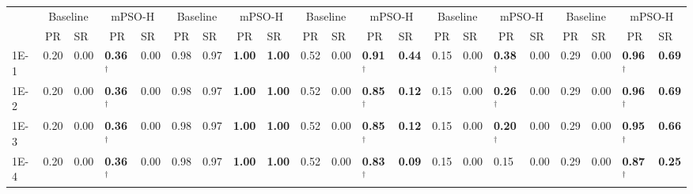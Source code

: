 \begin{table*}[h]
{\begin{tabular}{|p{4.8mm}|p{4.4mm}|p{4.4mm}|p{4.4mm}|p{4.4mm}|p{4.4mm}|p{4.4mm}|p{4.4mm}|p{4.4mm}|p{4.4mm}|p{4.4mm}|p{4.4mm}|p{4.4mm}|p{4.4mm}|p{4.4mm}|p{4.4mm}|p{4.4mm}|p{4.4mm}|p{4.4mm}|p{4.4mm}|p{4.4mm}|}
    \cline{2-21}
    & \multicolumn{2}{c|}{Baseline} & \multicolumn{2}{c|}{mPSO-H} & \multicolumn{2}{c|}{Baseline} & \multicolumn{2}{c|}{mPSO-H} & \multicolumn{2}{c|}{Baseline} & \multicolumn{2}{c|}{mPSO-H} & \multicolumn{2}{c|}{Baseline} & \multicolumn{2}{c|}{mPSO-H} & \multicolumn{2}{c|}{Baseline} & \multicolumn{2}{c|}{mPSO-H} \\

    \cline{2-21}
     & \multicolumn{1}{c|}{PR} & SR & \multicolumn{1}{c|}{PR} & SR & \multicolumn{1}{c|}{PR} & SR & \multicolumn{1}{c|}{PR} & SR & \multicolumn{1}{c|}{PR} & SR & \multicolumn{1}{c|}{PR} & SR & \multicolumn{1}{c|}{PR} & SR & \multicolumn{1}{c|}{PR} & SR & \multicolumn{1}{c|}{PR} & SR & \multicolumn{1}{c|}{PR} & SR \\
    \hline
    1E-1 & 0.20 & 0.00 & \textcolor{customblue}{\textbf{0.36$^\dagger$}} & 0.00 & 0.98 & 0.97 & \textcolor{customblue}{\textbf{1.00}} & \textcolor{customblue}{\textbf{1.00}} & 0.52 & 0.00 & \textcolor{customblue}{\textbf{0.91$^\dagger$}} & \textcolor{customblue}{\textbf{0.44}} & 0.15 & 0.00 & \textcolor{customblue}{\textbf{0.38$^\dagger$}} & 0.00 & 0.29 & 0.00 & \textcolor{customblue}{\textbf{0.96$^\dagger$}} & \textcolor{customblue}{\textbf{0.69}} \\
    1E-2 & 0.20 & 0.00 & \textcolor{customblue}{\textbf{0.36$^\dagger$}} & 0.00 & 0.98 & 0.97 & \textcolor{customblue}{\textbf{1.00}} & \textcolor{customblue}{\textbf{1.00}} & 0.52 & 0.00 & \textcolor{customblue}{\textbf{0.85$^\dagger$}} & \textcolor{customblue}{\textbf{0.12}} & 0.15 & 0.00 & \textcolor{customblue}{\textbf{0.26$^\dagger$}} & 0.00 & 0.29 & 0.00 & \textcolor{customblue}{\textbf{0.96$^\dagger$}} & \textcolor{customblue}{\textbf{0.69}} \\
    1E-3 & 0.20 & 0.00 & \textcolor{customblue}{\textbf{0.36$^\dagger$}} & 0.00 & 0.98 & 0.97 & \textcolor{customblue}{\textbf{1.00}} & \textcolor{customblue}{\textbf{1.00}} & 0.52 & 0.00 & \textcolor{customblue}{\textbf{0.85$^\dagger$}} & \textcolor{customblue}{\textbf{0.12}} & 0.15 & 0.00 & \textcolor{customblue}{\textbf{0.20$^\dagger$}} & 0.00 & 0.29 & 0.00 & \textcolor{customblue}{\textbf{0.95$^\dagger$}} & \textcolor{customblue}{\textbf{0.66}} \\
    1E-4 & 0.20 & 0.00 & \textcolor{customblue}{\textbf{0.36$^\dagger$}} & 0.00 & 0.98 & 0.97 & \textcolor{customblue}{\textbf{1.00}} & \textcolor{customblue}{\textbf{1.00}} & 0.52 & 0.00 & \textcolor{customblue}{\textbf{0.83$^\dagger$}} & \textcolor{customblue}{\textbf{0.09}} & 0.15 & 0.00 & 0.15 & 0.00 & 0.29 & 0.00 & \textcolor{customblue}{\textbf{0.87$^\dagger$}} & \textcolor{customblue}{\textbf{0.25}} \\

\end{tabular}}
\end{table*}
